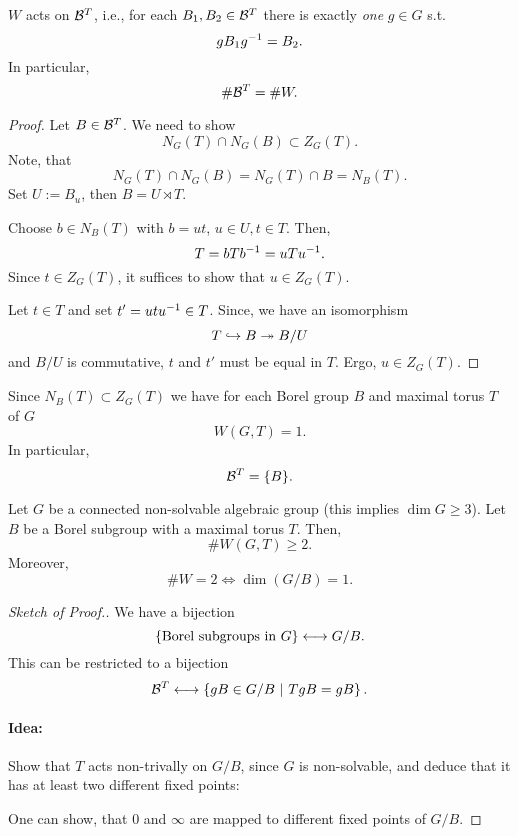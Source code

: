 \begin{theorem}
	$W$ acts  on $\mathcal{B}^T$, i.e., for each $B_1, B_2 \in \mathcal{B}^T$ there is exactly \emph{one} $g \in G$ s.t.
	\[ gB_1g^{-1} = B_2. \]
	In particular,
	\[ \#\mathcal{B}^T = \# W. \]
\end{theorem}
\begin{proof}
	Let $B \in \mathcal{B}^T$. We need to show
	\[ N_G(T) \cap N_G(B) \subset Z_G(T). \]
	Note, that
	\[ N_G(T) \cap N_G(B) = N_G(T) \cap B = N_B(T). \]
	Set $U := B_u$, then $B = U \rtimes T$.
	
	Choose $b \in N_B(T)$ with $b = ut$, $u\in U, t \in T$. Then,
	\[ T = bTb^{-1} = uTu^{-1}. \]
	Since $t \in Z_G(T)$, it suffices to show that $u \in Z_G(T)$.
	
	Let $t \in T$ and set $t' = utu^{-1} \in T$. Since, we have an isomorphism
	\[ T \overset{}{\hookrightarrow} B \overset{}{\twoheadrightarrow} B/U \]
	and $B/U$ is commutative, $t$ and $t'$ must be equal in $T$. Ergo, $u \in Z_G(T)$.
\end{proof}

\begin{corollary}
	Since $N_B(T) \subset Z_G(T)$ we have for each Borel group $B$ and maximal torus $T$ of $G$
	\[ W(G,T) = 1. \]
	In particular,
	\[\mathcal{B}^T = \{B\}. \]
\end{corollary}

\begin{proposition}
Let $G$ be a connected non-solvable algebraic group (this implies $\dim G \geq 3$). Let $B$ be a Borel subgroup with a maximal torus $T$. Then,
\[\# W(G,T) \geq 2. \]
Moreover,
\[\# W = 2 \iff \dim(G / B) = 1. \]
\end{proposition}
\begin{proof}[Sketch of Proof.]
	We have a bijection
	\[ \left\lbrace\text{Borel subgroups in }G\right\rbrace \longleftrightarrow G / B. \]
	This can be restricted to a bijection
	\[ \mathcal{B}^T \longleftrightarrow \left\lbrace gB \in G/B ~ | ~ TgB = gB\right\rbrace. \]
	\paragraph{Idea:} Show that $T$ acts non-trivally on $G/B$, since $G$ is non-solvable, and deduce that it has at least two different fixed points:
	\begin{center}
	\end{center}
One can show, that $0$ and $\infty$ are mapped to different fixed points of $G/B$.
\end{proof}